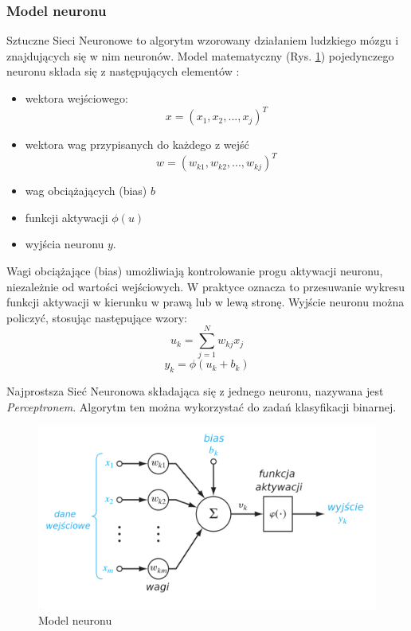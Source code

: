 \subsubsection{Model neuronu}
Sztuczne Sieci Neuronowe to algorytm wzorowany działaniem ludzkiego mózgu 
i znajdujących się w nim neuronów. Model matematyczny (Rys. \ref{neuron}) pojedynczego neuronu składa się z następujących elementów \cite{Omondi2006FPGAIO}:
\begin{itemize}
  \item wektora wejściowego: 
  $$x = (x_1, x_2,...,x_j)^T$$
  \item wektora wag przypisanych do każdego z wejść
  $$w = (w_{k1}, w_{k2},...,w_{kj})^T$$
  \item wag obciążających (bias) $b$
  \item funkcji aktywacji $\phi(u)$ 
  \item wyjścia neuronu $y$. 
\end{itemize}
Wagi obciążające (bias) umożliwiają kontrolowanie progu aktywacji neuronu, niezależnie od wartości wejściowych. W praktyce oznacza to przesuwanie wykresu funkcji aktywacji w kierunku w prawą lub w lewą stronę. Wyjście neuronu można policzyć, stosując następujące wzory:
$$u_k = \sum_{j=1}^{N}{w_{kj}x_j} $$ 
$$y_k = \phi(u_k + b_k) $$ 

Najprostsza Sieć Neuronowa składająca się z jednego neuronu, nazywana jest \emph{Perceptronem}. Algorytm ten można wykorzystać do zadań klasyfikacji binarnej.

\begin{figure}[h]
  \centering
  \includegraphics[width=\textwidth]{img/neuron.png}
  \caption{Model neuronu}
  \label{neuron}
\end{figure}


